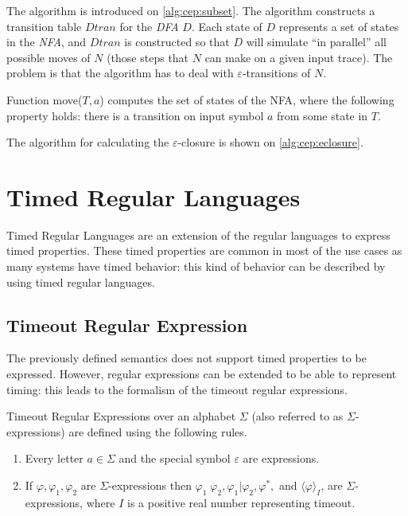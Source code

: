 			The algorithm is introduced on \cref{alg:cep:subset}.
			The algorithm constructs a transition table $\mathit{Dtran}$ for the \textit{DFA} $D$. Each state of $D$ represents a set of states in the \textit{NFA}, and $\mathit{Dtran}$ is constructed so that $D$ will simulate ``in parallel'' all possible moves of $N$ (those steps that $N$ can make on a given input trace). The problem is that the algorithm has to deal with $\varepsilon$-transitions of $N$.
	
			Function move($T,a$) computes the set of states of the NFA, where the following property holds: there is a transition on input symbol $a$ from some state in $T$. 
			
			The algorithm for calculating the $\varepsilon$-closure is shown on \cref{alg:cep:eclosure}.
			
		\section{Timed Regular Languages}	
		
		Timed Regular Languages are an extension of the regular languages to express timed properties.
		These timed properties are common in most of the use cases as many systems have timed behavior: this kind of behavior can be described by using timed regular languages.
		
			\subsection{Timeout Regular Expression}
		
			The previously defined semantics does not support timed properties to be expressed. However, regular expressions can be extended to be able to represent timing: this leads to the formalism of the timeout regular expressions.
			
			\begin{dfn}
				\label{dfn:cep:tre}
				Timeout Regular Expressions over an alphabet $\Sigma$ (also referred to as $\Sigma$-expressions)
				are defined using the following rules.
				\begin{enumerate}
					\item Every letter $a \in \Sigma$ and the special symbol $\varepsilon$ are expressions.
					\item If $\varphi, \varphi_1, \varphi_2$ are $\Sigma$-expressions then %
						$ %
						\varphi_1 \; \varphi_2,
						\varphi_1 | \varphi_2,
						\varphi^\ast,$ and 
						$\langle \varphi \rangle_I$, 
						are $\Sigma$-expressions, where $I$ is a positive real number representing timeout. %
				\end{enumerate}
			\end{dfn}
	
